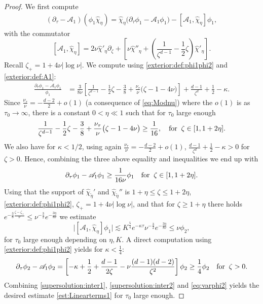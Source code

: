 \documentclass[11pt]{aims}
\theoremstyle{definition}
\newcommand{\As}{\mathscr{A}}
\newcommand{\pa}{\partial}
\newcommand{\be}{\begin{equation}}
\newcommand{\ee}{\end{equation}}
\numberwithin{equation}{section}
\begin{document}
\begin{proof}


We first compute
\begin{align*}
(\pa_\tau -\As_1) (\phi_1 \hat \chi_{\eta}) =  \hat \chi_{\eta} \big( \pa_\tau \phi_1 - \As_1 \phi_1 \big) - [\As_1, \hat \chi_{\eta}] \phi_1,
\end{align*}
with the commutator 
$$
[\As_1, \hat \chi_{ \eta}] = 2\nu {\hat \chi}'_{ \eta} \pa_\zeta  + \left[\nu  {\hat \chi}''_{ \eta} + \left( \frac{1}{\zeta^{d-1}} - \frac{1}{2}\zeta \right)  {\hat \chi}'_{ \eta} \right] .
$$
Recall $\zeta_+=1+4\nu |\log \nu|$. We compute using \eqref{exterior:def:phi1phi2} and \eqref{exterior:def:A1}:
\begin{align*}
\frac{\pa_\tau \phi_1 - \As_1 \phi_1}{\phi_1} &= \frac{3}{8\nu}\left[ \frac{1}{\zeta^{d-1}} - \frac{1}{2}\zeta - \frac 38 + \frac{\nu_\tau}{\nu} \big(\zeta - 1 - 4\nu \big) \right]+ \frac{d-1}{\zeta^d} + \frac{1}{2} - \kappa.
\end{align*}
Since $\frac{\nu_\tau}{\nu} = -\frac{d-2}{2}+o(1)$ (a consequence of \eqref{eq:Modnu}) where the $o(1)$ is as $\tau_0\to \infty$, there is a constant $0< \eta \ll 1$ such that for $\tau_0$ large enough
$$ \frac{1}{\zeta^{d-1}} - \frac{1}{2}\zeta - \frac 38 + \frac{\nu_\tau}{\nu} \big(\zeta - 1 - 4\nu \big) \geq \frac{1}{16} , \quad \textup{for}\;\; \zeta \in[1, 1+2\eta]. $$
We also have for $\kappa<1/2$, using again $\frac{\nu_\tau}{\nu} = -\frac{d-2}{2}+o(1)$, $\frac{d-1}{\zeta^d} + \frac{1}{2} - \kappa > 0$ for $\zeta > 0$. Hence, combining the three above equality and inequalities we end up with 
\be \label{supersolution:inter1}
\pa_\tau \phi_1 - \As_1 \phi_1\geq \frac{1}{16\nu} \phi_1 \quad \textup{for}\;\; \zeta \in [1, 1 + 2\eta].
\ee
Using that the support of $\hat \chi_{\tilde{ \eta}}'$ and $\hat \chi_{\tilde{ \eta}}''$ is $1+\eta \leq \zeta  \leq 1+ 2 \eta$, \eqref{exterior:def:phi1phi2}, $\zeta_+=1+4\nu |\log \nu|$, and that for $\zeta\geq 1+\eta$ there holds $e^{-\frac 38 \frac{\zeta-\zeta_+}{\nu}}\leq \nu^{-\frac 32}e^{-\frac{3 \eta}{8\nu}}$ we estimate 
\be \label{supersolution:inter2}
\Big| [\As_1, \hat \chi_{\eta}] \phi_1 \Big| \lesssim K^{\frac{5}{4}}  e^{-\kappa \tau} \nu^{-\frac 32} e^{- \frac{3\eta}{8\nu}} \leq \nu \phi_2,
\ee
for $\tau_0$ large enough depending on $\eta,K$. A direct computation using \eqref{exterior:def:phi1phi2} yields for $\kappa<\frac 14$:
\begin{equation}\label{eq:varphi2}
\pa_\tau \phi_2 - \As_1 \phi_2 = \left[ - \kappa + \frac{1}{2}+\frac{d-1}{2\zeta}-\nu \frac{(d-1)(d-2)}{\zeta^2} \right] \phi_2 \geq \frac{1}{4} \phi_2 \quad \textup{for} \;\; \zeta > 0.
\end{equation}
Combining \eqref{supersolution:inter1}, \eqref{supersolution:inter2} and \eqref{eq:varphi2} yields the desired estimate \eqref{est:Linearterms1} for $\tau_0$ large enough.
\end{proof}
\end{document}
